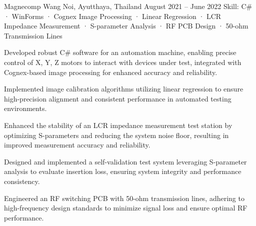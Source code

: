 \begin{cventries}
    {Magnecomp} %
    {Wang Noi, Ayutthaya, Thailand} %
    {August 2021 -- June 2022} %
    {Skill: C\# · WinForms · Cognex Image Processing · Linear Regression · LCR Impedance Measurement · S-parameter Analysis · RF PCB Design · 50-ohm Transmission Lines} %
    {
      \begin{cvitems} %
      \item {Developed robust C\# software for an automation machine, enabling precise control of X, Y, Z motors to interact with devices under test, integrated with Cognex-based image processing for enhanced accuracy and reliability.}
      \item {Implemented image calibration algorithms utilizing linear regression to ensure high-precision alignment and consistent performance in automated testing environments.}
      \item {Enhanced the stability of an LCR impedance measurement test station by optimizing S-parameters and reducing the system noise floor, resulting in improved measurement accuracy and reliability.}
      \item {Designed and implemented a self-validation test system leveraging S-parameter analysis to evaluate insertion loss, ensuring system integrity and performance consistency.}
      \item {Engineered an RF switching PCB with 50-ohm transmission lines, adhering to high-frequency design standards to minimize signal loss and ensure optimal RF performance.}
      \end{cvitems}
    }


\end{cventries}
